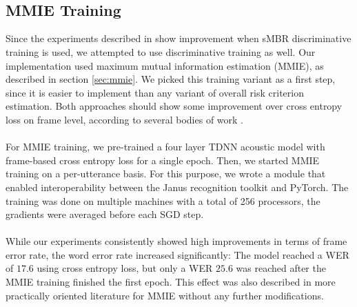 \begin{minipage}{\linewidth}
	\label{fig:newbob_fer}
\end{minipage}\\ \\
\subsection{MMIE Training}
Since the experiments described in \cite{peddinti2015jhu} show improvement when sMBR discriminative training is used, we attempted to use discriminative training as well. Our implementation used maximum mutual information estimation (MMIE), as described in section \ref{sec:mmie}. We picked this training variant as a first step, since it is easier to implement than any variant of overall risk criterion estimation. Both approaches should show some improvement over cross entropy loss on frame level, according to several bodies of work \cite{povey2005discriminative} \cite{ghoshal2013sequence}. \\ \\
For MMIE training, we pre-trained a four layer TDNN acoustic model with frame-based cross entropy loss for a single epoch. Then, we started MMIE training on a per-utterance basis. For this purpose, we wrote a module that enabled interoperability between the Janus recognition toolkit and PyTorch. The training was done on multiple machines with a total of 256 processors, the gradients were averaged before each SGD step. \\ \\
While our experiments consistently showed high improvements in terms of frame error rate, the word error rate increased significantly: The model reached a WER of $17.6$ using cross entropy loss, but only a WER $25.6$ was reached after the MMIE training finished the first epoch. This effect was also described in more practically oriented literature \cite{su2013error} for MMIE without any further modifications. 


